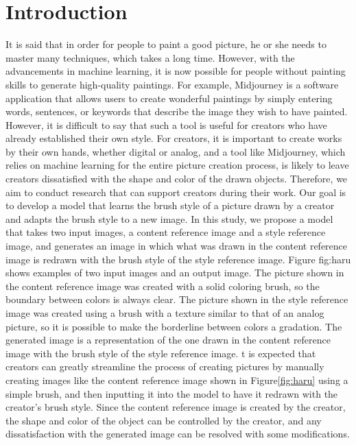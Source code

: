\documentclass{mva_style}
\begin{document}
\section{Introduction}
It is said that in order for people to paint a good picture, he or she needs 
to master many techniques, which takes a long time. However, with the 
advancements in machine learning, it is now possible for people without 
painting skills to generate high-quality paintings. 
For example, Midjourney\cite{Midjourney} is a software application that 
allows users to create wonderful paintings by simply entering words, 
sentences, or keywords that describe the image they wish to have painted. 
However, it is difficult to say that such a tool is useful for creators who 
have already established their own style. For creators, it is important to 
create works by their own hands, whether digital or analog, and a tool like 
Midjourney, which relies on machine learning for the entire picture creation 
process, is likely to leave creators dissatisfied with the shape and color 
of the drawn objects. Therefore, we aim to conduct research that can support 
creators during their work. Our goal is to develop a model that learns the 
brush style of a picture drawn by a creator and adapts the brush style to a 
new image. In this study, we propose a model that takes two input images, 
a content reference image and a style reference image, and generates an image 
in which what was drawn in the content reference image is redrawn with the 
brush style of the style reference image. 
Figure {fig:haru} shows examples of two input images and an output image.
The picture shown in the content reference image was created with a solid 
coloring brush, so the boundary between colors is always clear. The picture 
shown in the style reference image was created using a brush with a texture 
similar to that of an analog picture, so it is possible to make the 
borderline between colors a gradation. The generated image is a 
representation of the one drawn in the content reference image with the 
brush style of the style reference image.
t is expected that creators can greatly streamline the process of creating 
pictures by manually creating images like the content reference image shown 
in Figure\ref{fig:haru} using a simple brush, and then inputting it into the 
model to have it redrawn with the creator's brush style. Since the content 
reference image is created by the creator, the shape and color of the object 
can be controlled by the creator, and any dissatisfaction with the generated 
image can be resolved with some modifications.
\end{document}
